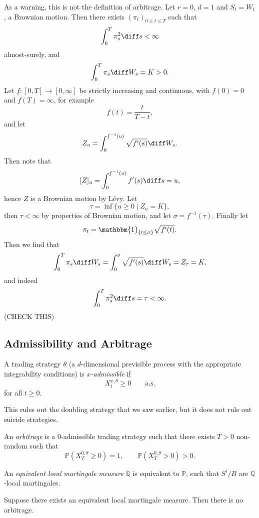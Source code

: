 \documentclass[12pt]{article}
\begin{document}
As a warning, this is not the definition of arbitrage. Let $r = 0$, $d = 1$ and $S_t = W_t$, a Brownian motion. Then there exists $(\pi_t)_{0 \leq t \leq T}$ such that
\[
\int_0^{T} \pi_s^2 \diff s < \infty
\]
almost-surely, and
\[
\int_0^{T} \pi_s \diff W_s = K > 0.
\]
Let $f : [0, T] \to [0, \infty]$ be strictly increasing and continuous, with $f(0) = 0$ and $f(T) = \infty$, for example
\[
f(t) = \frac{t}{T - t},
\]
and let
\[
	Z_u = \int_0^{f^{-1}(u)} \sqrt{f'(s)} \diff W_s.
\]
Then note that
\[
	[Z]_u = \int_0^{f^{-1}(u)}f'(s) \diff s = u,
\]
hence $Z$ is a Brownian motion by L\'evy. Let 
\[
	\tau = \inf \{u \geq 0 \mid Z_u = K\},
\]
then $\tau < \infty$ by properties of Brownian motion, and let $\sigma = f^{-1}(\tau)$. Finally let
\[
	\pi_t = \mathbbm{1}_{\{t \leq \sigma\}} \sqrt{f'(t)}.
\]
Then we find that
\[
	\int_0^{T} \pi_s \diff W_s = \int_0^{\sigma} \sqrt{f'(s)} \diff W_s = Z_\tau = K,
\]
and indeed
\[
\int_0^{T} \pi_s^2 \diff s = \tau < \infty.
\]
(CHECK THIS)


\subsection{Admissibility and Arbitrage}%
\label{sub:aa}

\begin{definition}
	A trading strategy $\theta$ (a $d$-dimensional previsible process with the appropriate integrability conditions) is \emph{$x$-admissible} if
	\[
		X_t^{x, \theta} \geq 0 \qquad \text{a.s.}
	\]
	for all $t \geq 0$.
\end{definition}

This rules out the doubling strategy that we saw earlier, but it does not rule out suicide strategies.

\begin{definition}
	An \emph{arbitrage} is a 0-admissible trading strategy such that there exists $T > 0$ non-random such that
	\[
	\mathbb{P}(X_T^{0, \theta} \geq 0) = 1, \qquad \mathbb{P}(X_T^{0, \theta} > 0) > 0.
	\]
\end{definition}

\begin{definition}
	An \emph{equivalent local martingale measure} $\mathbb{Q}$ is equivalent to $\mathbb{P}$, such that $S^i/B$ are $\mathbb{Q}$-local martingales.
\end{definition}

\begin{theorem}
	Suppose there exists an equivalent local martingale measure. Then there is no arbitrage.
\end{theorem}
\end{document}
